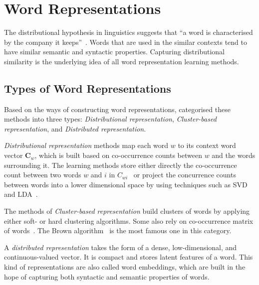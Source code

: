 \section{Word Representations}
\label{wordrep}
The distributional hypothesis in linguistics suggests that ``a word is characterised by the company it keeps''~\cite{firth1957}. Words that are used in the similar contexts tend to have similar semantic and syntactic properties. Capturing distributional similarity is the underlying idea of all word representation learning methods. 

\subsection{Types of Word Representations}
Based on the ways of constructing word representations,  categorised these methods into three types: \textit{Distributional representation},  \textit{Cluster-based representation}, and \textit{Distributed representation}.

\textit{Distributional representation} methods map each word $w$ to its context word vector $\mathbf{C}_w$, which is built based on co-occurrence counts between $w$ and the words surrounding it. The learning methods store either directly the co-occurrence count between two words $w$ and $i$ in $C_{wi}$~\cite{} or project the concurrence counts between words into a lower dimensional space by using techniques such as SVD~\cite{} and LDA~\cite{}. 

The methods of \textit{Cluster-based representation} build clusters of words by applying either soft- or hard clustering algorithms. Some also rely on co-occurrence matrix of words~\cite{}. The Brown algorithm~\cite{Brown92class-basedn-gram} is the most famous one in this category.

A \textit{distributed representation} takes the form of a dense, low-dimensional, and continuous-valued vector. It is compact and stores latent features of a word. This kind of representations are also called word embeddings, which are built in the hope of capturing both syntactic and semantic properties of words.

